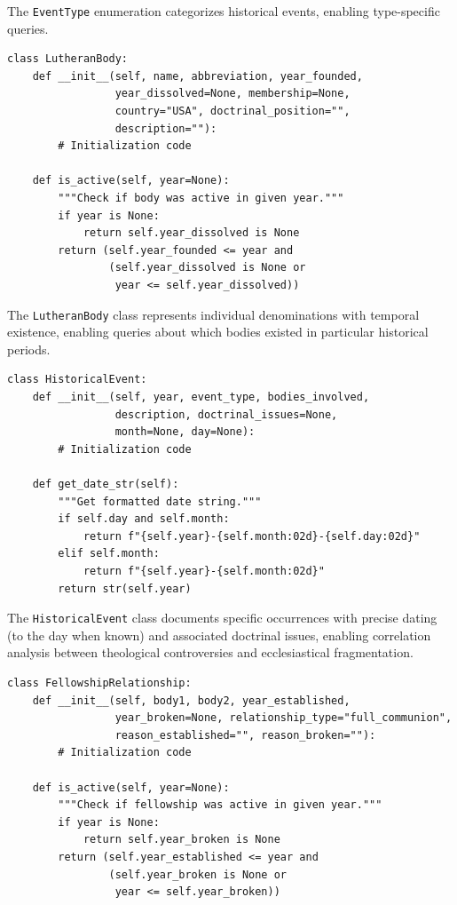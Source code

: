 The \texttt{EventType} enumeration categorizes historical events, enabling type-specific queries.

\begin{verbatim}
class LutheranBody:
    def __init__(self, name, abbreviation, year_founded,
                 year_dissolved=None, membership=None,
                 country="USA", doctrinal_position="",
                 description=""):
        # Initialization code

    def is_active(self, year=None):
        """Check if body was active in given year."""
        if year is None:
            return self.year_dissolved is None
        return (self.year_founded <= year and
                (self.year_dissolved is None or
                 year <= self.year_dissolved))
\end{verbatim}

The \texttt{LutheranBody} class represents individual denominations with temporal existence, enabling queries about which bodies existed in particular historical periods.

\begin{verbatim}
class HistoricalEvent:
    def __init__(self, year, event_type, bodies_involved,
                 description, doctrinal_issues=None,
                 month=None, day=None):
        # Initialization code

    def get_date_str(self):
        """Get formatted date string."""
        if self.day and self.month:
            return f"{self.year}-{self.month:02d}-{self.day:02d}"
        elif self.month:
            return f"{self.year}-{self.month:02d}"
        return str(self.year)
\end{verbatim}

The \texttt{HistoricalEvent} class documents specific occurrences with precise dating (to the day when known) and associated doctrinal issues, enabling correlation analysis between theological controversies and ecclesiastical fragmentation.

\begin{verbatim}
class FellowshipRelationship:
    def __init__(self, body1, body2, year_established,
                 year_broken=None, relationship_type="full_communion",
                 reason_established="", reason_broken=""):
        # Initialization code

    def is_active(self, year=None):
        """Check if fellowship was active in given year."""
        if year is None:
            return self.year_broken is None
        return (self.year_established <= year and
                (self.year_broken is None or
                 year <= self.year_broken))
\end{verbatim}

